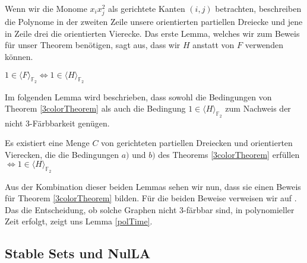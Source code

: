 \noindent Wenn wir die Monome $x_ix_j^2$ als gerichtete Kanten $(i,j)$ betrachten, beschreiben die Polynome in der zweiten Zeile unsere orientierten partiellen Dreiecke und jene in Zeile drei die orientierten Vierecke. Das erste Lemma, welches wir zum Beweis für unser Theorem benötigen, sagt aus, dass wir $H$ anstatt von $F$ verwenden können.

\begin{lemma}
$1 \in \langle F \rangle_{\mathbb{F}_2} \Leftrightarrow 1 \in \langle H \rangle_{\mathbb{F}_2}$ 
\end{lemma}

\noindent Im folgenden Lemma wird beschrieben, dass sowohl die Bedingungen von Theorem \ref{3colorTheorem} als auch die Bedingung $1 \in \langle H \rangle_{\mathbb{F}_2}$ zum Nachweis der nicht 3-Färbbarkeit genügen.

\begin{lemma}
Es existiert eine Menge $C$ von gerichteten partiellen Dreiecken und orientierten Vierecken, die die Bedingungen $a)$ und $b)$ des Theorems \ref{3colorTheorem} erfüllen $
\Leftrightarrow 1 \in \langle H \rangle_{\mathbb{F}_2}$ 
\end{lemma}

\noindent Aus der Kombination dieser beiden Lemmas sehen wir nun, dass sie einen Beweis für Theorem \ref{3colorTheorem} bilden. Für die beiden Beweise verweisen wir auf \cite{Ausgangsartikel}. Das die Entscheidung, ob solche Graphen nicht 3-färbbar sind, in polynomieller Zeit erfolgt, zeigt uns Lemma \ref{polTime}.  


\subsection{Stable Sets und NulLA} \label{StableNulLA}

